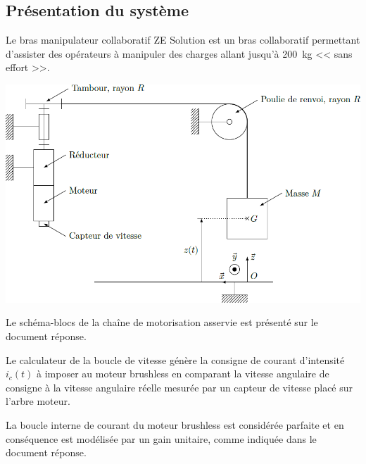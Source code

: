 \documentclass[10pt,fleqn]{article} %
\begin{document}
\def\pathfig{images}

\vspace{4.5cm}
\pagestyle{fancy}
\thispagestyle{plain}

\def\columnseprulecolor{\color{ocre}}
\setlength{\columnseprule}{0.4pt} 

\def\pathfig{images}

\ifprof
\else
\begin{multicols}{2}
\fi


\subsection*{Présentation du système}
\setcounter{subparagraph}{0}
Le bras manipulateur collaboratif ZE Solution est un bras collaboratif permettant d'assister des opérateurs à manipuler des charges allant jusqu'à \SI{200}{kg} << sans effort >>. 


\begin{center}
\includegraphics[width=\linewidth]{images/fig_01}
\end{center}

Le schéma-blocs de la chaîne de motorisation asservie est présenté sur le document réponse.

Le calculateur de la boucle de vitesse génère la consigne de courant d’intensité $i_c(t)$ à imposer au moteur brushless en comparant la vitesse angulaire de consigne à la vitesse angulaire réelle mesurée par un capteur de vitesse placé sur l’arbre moteur.

La boucle interne de courant du moteur brushless est considérée parfaite et en conséquence est modélisée par un gain unitaire, comme indiquée dans le document réponse.


\end{multicols}
\end{document}
